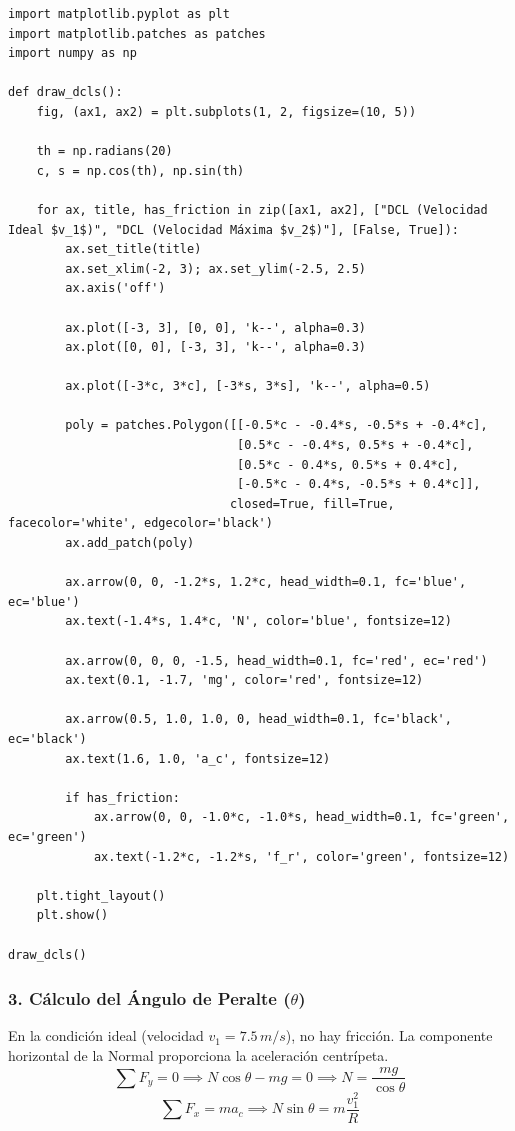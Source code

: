 \documentclass[12pt, a4paper]{article}
\begin{document}
\begin{lstlisting}
import matplotlib.pyplot as plt
import matplotlib.patches as patches
import numpy as np

def draw_dcls():
    fig, (ax1, ax2) = plt.subplots(1, 2, figsize=(10, 5))
    
    th = np.radians(20) 
    c, s = np.cos(th), np.sin(th)
    
    for ax, title, has_friction in zip([ax1, ax2], ["DCL (Velocidad Ideal $v_1$)", "DCL (Velocidad Máxima $v_2$)"], [False, True]):
        ax.set_title(title)
        ax.set_xlim(-2, 3); ax.set_ylim(-2.5, 2.5)
        ax.axis('off')
        
        ax.plot([-3, 3], [0, 0], 'k--', alpha=0.3)
        ax.plot([0, 0], [-3, 3], 'k--', alpha=0.3)
        
        ax.plot([-3*c, 3*c], [-3*s, 3*s], 'k--', alpha=0.5)
        
        poly = patches.Polygon([[-0.5*c - -0.4*s, -0.5*s + -0.4*c], 
                                [0.5*c - -0.4*s, 0.5*s + -0.4*c], 
                                [0.5*c - 0.4*s, 0.5*s + 0.4*c], 
                                [-0.5*c - 0.4*s, -0.5*s + 0.4*c]], 
                               closed=True, fill=True, facecolor='white', edgecolor='black')
        ax.add_patch(poly)
        
        ax.arrow(0, 0, -1.2*s, 1.2*c, head_width=0.1, fc='blue', ec='blue')
        ax.text(-1.4*s, 1.4*c, 'N', color='blue', fontsize=12)
        
        ax.arrow(0, 0, 0, -1.5, head_width=0.1, fc='red', ec='red')
        ax.text(0.1, -1.7, 'mg', color='red', fontsize=12)
        
        ax.arrow(0.5, 1.0, 1.0, 0, head_width=0.1, fc='black', ec='black')
        ax.text(1.6, 1.0, 'a_c', fontsize=12)
        
        if has_friction:
            ax.arrow(0, 0, -1.0*c, -1.0*s, head_width=0.1, fc='green', ec='green')
            ax.text(-1.2*c, -1.2*s, 'f_r', color='green', fontsize=12)

    plt.tight_layout()
    plt.show()

draw_dcls()
\end{lstlisting}

\subsubsection*{3. Cálculo del Ángulo de Peralte ($\theta$)}
En la condición ideal (velocidad $v_1 = 7.5 \, \si{m/s}$), no hay fricción. La componente horizontal de la Normal proporciona la aceleración centrípeta.
$$ \sum F_y = 0 \implies N \cos\theta - mg = 0 \implies N = \frac{mg}{\cos\theta} $$
$$ \sum F_x = m a_c \implies N \sin\theta = m \frac{v_1^2}{R} $$
\end{document}
